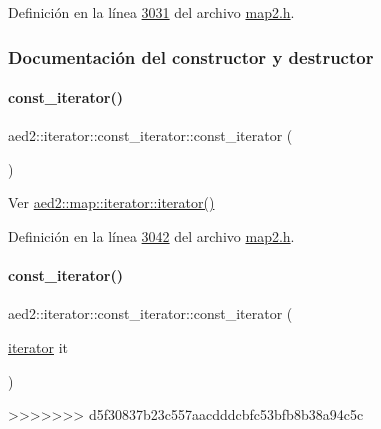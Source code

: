 Definición en la línea \hyperlink{map2_8h_source_l03031}{3031} del archivo \hyperlink{map2_8h_source}{map2.\+h}.



\subsubsection{Documentación del constructor y destructor}
\mbox{\label{classaed2_1_1iterator_1_1const__iterator_aaa51a026552b907959961fb5e890f786_aaa51a026552b907959961fb5e890f786}} 
\paragraph{\texorpdfstring{const\+\_\+iterator()}{const\_iterator()}\hspace{0.1cm}{\footnotesize\ttfamily [1/3]}}
{\footnotesize\ttfamily aed2\+::iterator\+::const\+\_\+iterator\+::const\+\_\+iterator (\begin{DoxyParamCaption}{ }\end{DoxyParamCaption})\hspace{0.3cm}{\ttfamily [inline]}}



Ver \hyperlink{classaed2_1_1map_1_1iterator_acdd790eb54216601a2e0591776004dba_acdd790eb54216601a2e0591776004dba}{aed2\+::map\+::iterator\+::iterator()} 



Definición en la línea \hyperlink{map2_8h_source_l03042}{3042} del archivo \hyperlink{map2_8h_source}{map2.\+h}.

\mbox{\label{classaed2_1_1iterator_1_1const__iterator_a721711310bb4fc525e4ce9a2b13f7ce9_a721711310bb4fc525e4ce9a2b13f7ce9}} 
\paragraph{\texorpdfstring{const\+\_\+iterator()}{const\_iterator()}\hspace{0.1cm}{\footnotesize\ttfamily [2/3]}}
{\footnotesize\ttfamily aed2\+::iterator\+::const\+\_\+iterator\+::const\+\_\+iterator (\begin{DoxyParamCaption}\item[{\hyperlink{classaed2_1_1iterator_1_1iterator}{iterator}}]{it }\end{DoxyParamCaption})\hspace{0.3cm}{\ttfamily [inline]}}
>>>>>>> d5f30837b23c557aacdddcbfc53bfb8b38a94c5c



